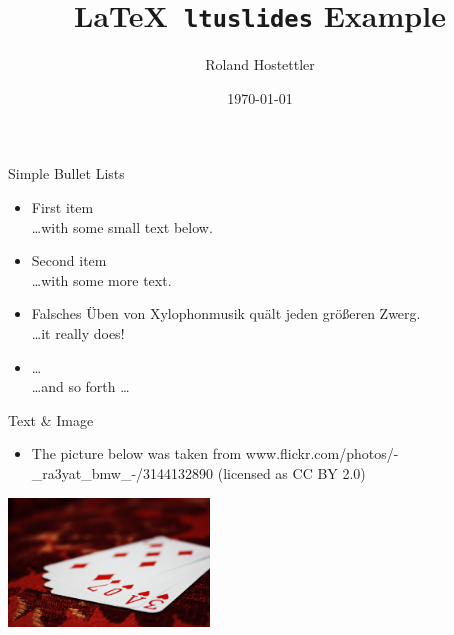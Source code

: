 \documentclass{ltusimple}
\begin{document}
\title{\LaTeX~\texttt{ltuslides} Example}
\author{Roland Hostettler}
\date{\today}
\maketitle


\begin{slide}{Simple Bullet Lists}
	\begin{itemize}
		\item First item\\
		    {\small \dots with some small text below.}

		\item Second item\\
		    {\small \dots with some more text.}

		\item Falsches Üben von Xylophonmusik quält jeden größeren Zwerg.\\
		    {\small \dots it really does!}

		\item \dots\\
		    {\small \dots and so forth \dots}
	\end{itemize}
\end{slide}


\begin{slide}{Text \& Image}
	\begin{itemize}
		\item The picture below was taken from www.flickr.com/photos/-\_ra3yat\_bmw\_-/3144132890 (licensed as CC BY 2.0)
	\end{itemize}
	\vspace{0.5cm}
	\begin{center}
		\includegraphics[width=0.4\textwidth]{template/example}
	\end{center}
\end{slide}
\end{document}

